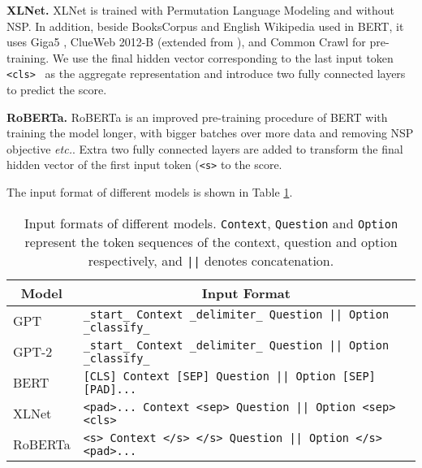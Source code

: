 \documentclass{article} \usepackage{iclr2020_conference,times}
\begin{document}
\textbf{XLNet. }
XLNet \citep{yang2019xlnet} is trained with Permutation Language Modeling and without NSP. In addition, beside  BooksCorpus and English Wikipedia used in BERT, it uses Giga5 \citep{parker2011english}, ClueWeb 2012-B (extended from \citep{callan2009clueweb09}), and Common Crawl \citep{commoncrawl} for pre-training. We use the final hidden vector corresponding to the last input token {\tt <cls> } as the aggregate representation and introduce two fully connected layers to predict the score.
	

\textbf{RoBERTa. }
RoBERTa \citep{liu2019roberta} is an improved pre-training procedure of BERT with training the model longer, with bigger batches over more data and removing NSP objective \textit{etc.}. Extra two fully connected layers are added to transform the final hidden vector of the first input token ({\tt <s>} to the score.

The input format of different models is shown in Table \ref{input-organization-form}.

\begin{table}[ht]
\scriptsize
		\caption{Input formats of different models. {\tt Context}, {\tt Question} and {\tt Option} represent the token sequences of the context, question and option respectively, and {\tt ||} denotes concatenation.}
		\label{input-organization-form}
		\begin{center}
			\begin{tabular}{ll}
				\multicolumn{1}{c}{\bf Model}  &\multicolumn{1}{c}{\bf Input Format}
				\\ \hline 
				GPT \citet{radford2018improving} & {\tt \_start\_ Context \_delimiter\_ Question || Option \_classify\_} \\
				GPT-2 \citet{radford2019language} & {\tt \_start\_ Context \_delimiter\_ Question || Option \_classify\_} \\
				BERT \citep{devlin2019bert}        & {\tt[CLS] Context [SEP] Question || Option [SEP] [PAD]...} \\
				XLNet  \citep{yang2019xlnet}      & {\tt <pad>... Context <sep> Question || Option <sep> <cls>} \\
				RoBERTa \citep{liu2019roberta}     & {\tt<s> Context </s> </s> Question || Option </s> <pad>... } \\
			\end{tabular}
		\end{center}
	\end{table}
\end{document}
